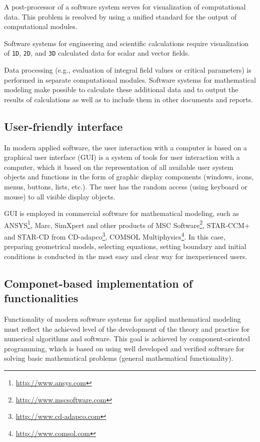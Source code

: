 \documentclass{elsarticle}
\begin{document}
A post-processor of a software system serves for visualization of computational data. 
This problem is resolved by using a unified standard for the output of computational modules.

Software systems for engineering and scientific calculations require
visualization of \texttt{1D}, \texttt{2D}, and \texttt{3D} calculated
data for scalar and vector fields.

Data processing (e.g., evaluation of integral field values or critical parameters) 
is performed in separate computational modules. 
Software systems for mathematical modeling make possible to calculate these additional data
and to output the results of calculations as well as to include them in other documents and reports.

\subsection{User-friendly interface}

In modern applied software, the user interaction with a computer is
based on a graphical user interface (GUI) is a system of tools for
user interaction with a computer, which it based on the representation
of all available user system objects and functions in the form of
graphic display components (windows, icons, menus, buttons, lists,
etc.).  The user has the random access (using keyboard or mouse) to
all visible display objects.

GUI is employed in commercial software for mathematical modeling, 
such as \textsf{ANSYS}\footnote{\url{http://www.ansys.com}}, \textsf{Marc}, \textsf{SimXpert} and 
other products of MSC Software\footnote{\url{http://www.mscsoftware.com}}, 
\textsf{STAR-CCM+} and \textsf{STAR-CD}
from CD-adapco\footnote{\url{http://www.cd-adapco.com}}, 
\textsf{COMSOL Multiphysics}\footnote{\url{http://www.comsol.com}}.
In this case, preparing geometrical models, selecting equations, setting boundary and initial conditions is conducted in
the most easy and clear way for inexperienced users.

\subsection{Componet-based implementation of functionalities} 

Functionality of modern software systems for applied mathematical modeling must reflect the achieved level 
of the development of the theory and practice for numerical algorithms and software.
This goal is achieved by component-oriented programming, which is based on using well developed and 
verified software for solving basic mathematical problems (general mathematical functionality). 
\end{document}
